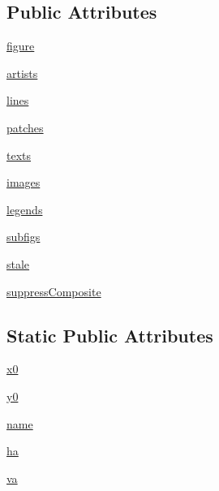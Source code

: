 \subsection*{Public Attributes}
\begin{DoxyCompactItemize}
\item 
\hyperlink{classmatplotlib_1_1figure_1_1FigureBase_a3a47be3d80c3ccabe78703b5d304ea79}{figure}
\item 
\hyperlink{classmatplotlib_1_1figure_1_1FigureBase_a2036c6daf6cd8ba5a263c99423d610f4}{artists}
\item 
\hyperlink{classmatplotlib_1_1figure_1_1FigureBase_a77efecce0ed159ae0e2c43af8f1eca86}{lines}
\item 
\hyperlink{classmatplotlib_1_1figure_1_1FigureBase_a93a9723ded19411a8c1898ffcfb51a29}{patches}
\item 
\hyperlink{classmatplotlib_1_1figure_1_1FigureBase_a830d38faefa0b0dbdb7b9033a2780320}{texts}
\item 
\hyperlink{classmatplotlib_1_1figure_1_1FigureBase_a2d62ff87e3064de136827f250f9b8970}{images}
\item 
\hyperlink{classmatplotlib_1_1figure_1_1FigureBase_ae3ed84697056981893d9f7c1473312f7}{legends}
\item 
\hyperlink{classmatplotlib_1_1figure_1_1FigureBase_ac922862efc6c62be78904ca216b744f7}{subfigs}
\item 
\hyperlink{classmatplotlib_1_1figure_1_1FigureBase_a58581e640fce27bfec3ec032b8312b01}{stale}
\item 
\hyperlink{classmatplotlib_1_1figure_1_1FigureBase_a32591a6a417e6e4674b728a5370999e0}{suppress\+Composite}
\end{DoxyCompactItemize}
\subsection*{Static Public Attributes}
\begin{DoxyCompactItemize}
\item 
\hyperlink{classmatplotlib_1_1figure_1_1FigureBase_ad66006309936c038ba353db4b81438be}{x0}
\item 
\hyperlink{classmatplotlib_1_1figure_1_1FigureBase_a9d5a484e62233fb7fb3999e64c0a7318}{y0}
\item 
\hyperlink{classmatplotlib_1_1figure_1_1FigureBase_a19e14be403f2bd7b5b41bf9d31ebd79e}{name}
\item 
\hyperlink{classmatplotlib_1_1figure_1_1FigureBase_a3a858504ac6968b3f7113edf45bbc931}{ha}
\item 
\hyperlink{classmatplotlib_1_1figure_1_1FigureBase_abc33ee9a6b246c44beff3f8958a693df}{va}
\end{DoxyCompactItemize}
